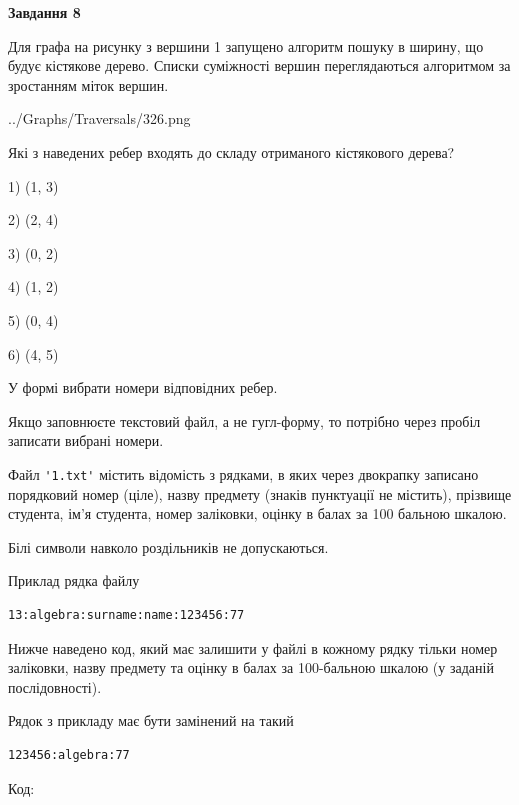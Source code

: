 \documentclass[12pt, ukrainian]{article}
\def\code#1{\Verb!#1!}
\begin{document}
{\begin {large}
{\begin {center}\textbf{Завдання 8}\end {center}}\par
Для графа на рисунку з вершини 1 запущено алгоритм пошуку в ширину, що будує кістякове дерево. Списки суміжності вершин переглядаються алгоритмом за зростанням міток вершин.\par
\begin{center}
	{../Graphs/Traversals/326.png}
\end{center}
\par Які з наведених ребер входять до складу отриманого кістякового дерева?\par
1) (1, 3)\par
2) (2, 4)\par
3) (0, 2)\par
4) (1, 2)\par
5) (0, 4)\par
6) (4, 5)\par
{\vskip 15pt} У формі вибрати номери відповідних ребер.


Якщо заповнюєте текстовий файл, а не гугл-форму, то потрібно через пробіл записа\-ти вибрані номери.\par
\newpage


Файл \code{'1.txt'} містить відомість з рядками, в яких через двокрапку записа\-но поряд\-ковий номер (ціле), назву предмету (знаків пунктуації не містить), прізвище студента, ім'я студента, номер заліковки, оцінку в балах за 100 бальною шкалою.

Білі символи навколо роздільників не допускаються.

Приклад рядка файлу



\begin{verbatim}
13:algebra:surname:name:123456:77
\end{verbatim}


Нижче наведено код, який має залишити у файлі в кожному рядку тільки номер заліковки, назву предмету та оцінку в балах за 100-бальною шкалою (у заданій послі\-дов\-ності).

Рядок з прикладу має бути замінений на такий



\begin{verbatim}
123456:algebra:77
\end{verbatim}




Код:




\end{large}}
\end{document}
